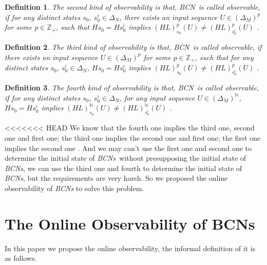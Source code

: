 \documentclass[conference]{IEEEtran} %
\newtheorem{definition}{Definition}
\def \BCN {{\em BCN}}
\def \BCNs {{\em BCNs}}
\begin{document}
\begin{definition}
	The second kind of observability is that, \BCN\ is called observable, if for any distinct states $s_0$, $s^i_0 \in \Delta_N$, there exists an input sequence $U\in(\Delta_M)^p$ for some $p\in \mathbb{Z}_+$, such that $Hs_0=Hs^i_0$ implies $(HL)^p_{s_0}(U)\neq (HL)^p_{s^i_0}(U)$ \cite{Zhao2010Input}.
\end{definition}
\begin{definition}
	The third kind of observability is that, \BCN\ is called observable, if there exists an input sequence $U\in(\Delta_M)^p$ for some $p\in \mathbb{Z}_+$, such that for any distinct states $s_0$, $s^i_0 \in \Delta_N$, $Hs_0=Hs^i_0$ implies $(HL)^p_{s_0}(U)\neq (HL)^p_{s^i_0}(U)$ \cite{Cheng2011Identification}.
\end{definition}
\begin{definition}
	The fourth kind of observability is that, \BCN\ is called observable, if for any distinct states $s_0$, $s^i_0 \in \Delta_N$, for any input sequence $U\in(\Delta_M)^{\mathbb{N}}$, $Hs_0=Hs^i_0$ implies $(HL)^{\mathbb{N}}_{s_0}(U)\neq (HL)^{\mathbb{N}}_{s^i_0}(U)$ \cite{Fornasini2013Observability}.
\end{definition}

<<<<<<< HEAD
We know that the fourth one implies the third one, second one and first one; the third one implies the second one and first one; the first one implies the second one \cite{Zhang2016Observability}.  And we may can't use the first one and second one to determine the initial state of \BCNs\ without presupposing the initial state of {\em BCNs}, we can use the third one and fourth to determine the initial state of {\em BCNs}, but the requirements are very harsh. So we proposed the online observability of {\em BCNs} to solve this problem.
\section{The Online Observability of BCNs}
In this paper we propose the online observability, the informal definition of it is as follows. 
\end{document}
